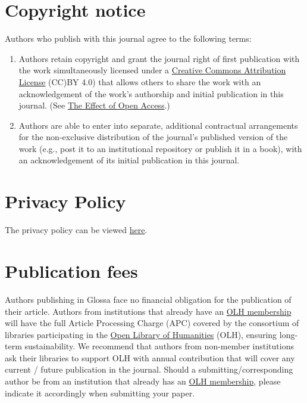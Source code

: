 \documentclass[charis,linguex,biblatex]{glossa}
\begin{document}
\section{Copyright notice}

Authors who publish with this journal agree to the following terms:

\begin{enumerate}[label=\arabic*.]
\item Authors retain copyright and grant the journal right of first publication with the work simultaneously licensed under a \href{https://creativecommons.org/licenses/by/4.0/}{Creative Commons Attribution License} (CC)BY 4.0) that allows others to share the work with an acknowledgement of the work's authorship and initial publication in this journal. (See \href{http://opcit.eprints.org/oacitation-biblio.html}{The Effect of Open Access}.)
\item Authors are able to enter into separate, additional contractual arrangements for the non-exclusive distribution of the journal's published version of the work (e.g., post it to an institutional repository or publish it in a book), with an acknowledgement of its initial publication in this journal.
\end{enumerate}

\section{Privacy Policy}

The privacy policy can be viewed \href{https://www.openlibhums.org/site/privacy/}{here}.

\section{Publication fees}

Authors publishing in Glossa face no financial obligation for the publication of their article. Authors from institutions that already have an  \href{https://www.openlibhums.org/plugins/supporters/}{OLH membership} will have the full Article Processing Charge (APC) covered by the consortium of libraries participating in the \href{https://www.openlibhums.org}{Open Library of Humanities} (OLH), ensuring long-term sustainability. We recommend that authors from non-member institutions ask their libraries to support OLH with annual contribution that will cover any current / future publication in the journal. Should a submitting/corresponding author be from an institution that already has an \href{https://www.openlibhums.org/plugins/supporters/}{OLH membership}, please indicate it accordingly when submitting your paper. 
\end{document}

